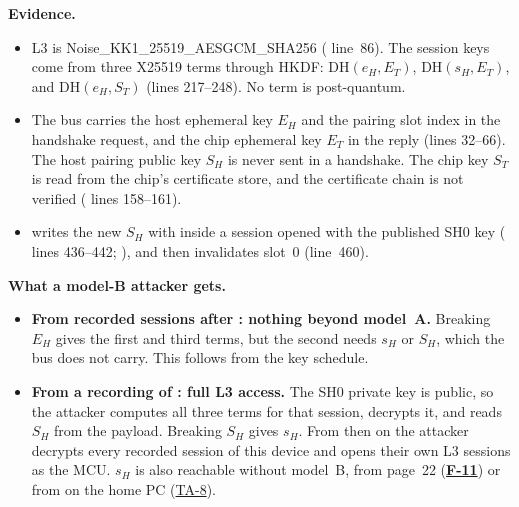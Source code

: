 \documentclass[11pt,a4paper]{article}
\newcommand{\fid}[1]{\textbf{#1}}
\begin{document}
\textbf{Evidence.}
\begin{itemize}
\item L3 is Noise\_KK1\_25519\_AESGCM\_SHA256 ( line~86). The session keys come from three X25519 terms through HKDF: $\mathrm{DH}(e_H, E_T)$, $\mathrm{DH}(s_H, E_T)$, and $\mathrm{DH}(e_H, S_T)$ (lines 217--248). No term is post-quantum.
\item The bus carries the host ephemeral key $E_H$ and the pairing slot index in the handshake request, and the chip ephemeral key $E_T$ in the reply (lines 32--66). The host pairing public key $S_H$ is never sent in a handshake. The chip key $S_T$ is read from the chip's certificate store, and the certificate chain is not verified ( lines 158--161).
\item {} writes the new $S_H$ with  inside a session opened with the published SH0 key ( lines 436--442; ), and then invalidates slot~0 (line~460).
\end{itemize}

\textbf{What a model-B attacker gets.}
\begin{itemize}
\item \textbf{From recorded sessions after : nothing beyond model~A.} Breaking $E_H$ gives the first and third terms, but the second needs $s_H$ or $S_H$, which the bus does not carry. This follows from the key schedule.
\item \textbf{From a recording of : full L3 access.} The SH0 private key is public, so the attacker computes all three terms for that session, decrypts it, and reads $S_H$ from the  payload. Breaking $S_H$ gives $s_H$. From then on the attacker decrypts every recorded session of this device and opens their own L3 sessions as the MCU. $s_H$ is also reachable without model~B, from page~22 (\hyperref[f:F-11]{\fid{F-11}}) or from  on the home PC (\hyperref[ta:TA-8]{TA-8}).
\end{itemize}
\end{document}
